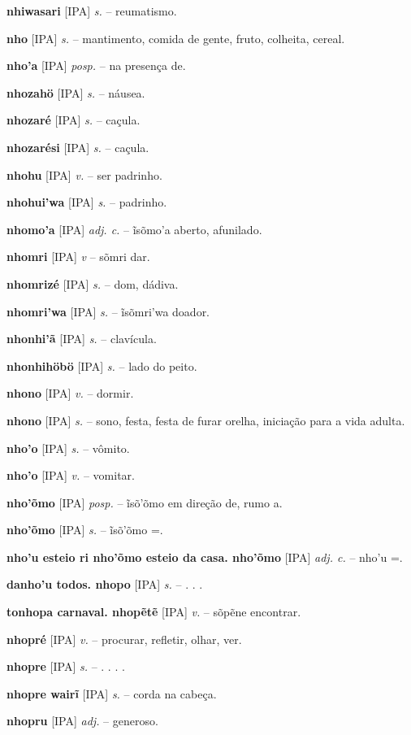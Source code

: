 \textbf{nhiwasari} [IPA] \textit{s.} -- reumatismo.

\textbf{nho} [IPA] \textit{s.} -- mantimento, comida de gente, fruto, colheita, cereal.

\textbf{nho'a} [IPA] \textit{posp.} -- na presença de.

\textbf{nhozahö} [IPA] \textit{s.} -- náusea.

\textbf{nhozaré} [IPA] \textit{s.} -- caçula.

\textbf{nhozarési} [IPA] \textit{s.} -- caçula.

\textbf{nhohu} [IPA] \textit{v.} -- ser padrinho.

\textbf{nhohui'wa} [IPA] \textit{s.} -- padrinho.

\textbf{nhomo'a} [IPA] \textit{adj. c.} -- ĩsõmo'a aberto, afunilado.

\textbf{nhomri} [IPA] \textit{v} -- sõmri dar.

\textbf{nhomrizé} [IPA] \textit{s.} -- dom, dádiva.

\textbf{nhomri'wa} [IPA] \textit{s.} -- ĩsõmri'wa doador.

\textbf{nhonhi'ã} [IPA] \textit{s.} -- clavícula.

\textbf{nhonhihöbö} [IPA] \textit{s.} -- lado do peito.

\textbf{nhono} [IPA] \textit{v.} -- dormir.

\textbf{nhono} [IPA] \textit{s.} -- sono, festa, festa de furar orelha, iniciação para a vida adulta.

\textbf{nho'o} [IPA] \textit{s.} -- vômito.

\textbf{nho'o} [IPA] \textit{v.} -- vomitar.

\textbf{nho'õmo} [IPA] \textit{posp.} -- ĩsõ'õmo em direção de, rumo a.

\textbf{nho'õmo} [IPA] \textit{s.} -- ĩsõ'õmo =.

\textbf{nho'u esteio  ri nho'õmo esteio da casa. nho'õmo} [IPA] \textit{adj. c.} -- nho'u =.

\textbf{danho'u todos. nhopo} [IPA] \textit{s.} -- . . .

\textbf{tonhopa carnaval. nhopẽtẽ} [IPA] \textit{v.} -- sõpẽne encontrar.

\textbf{nhopré} [IPA] \textit{v.} -- procurar, refletir, olhar, ver.

\textbf{nhopre} [IPA] \textit{s.} -- . . . .

\textbf{nhopre wairĩ} [IPA] \textit{s.} -- corda na cabeça.

\textbf{nhopru} [IPA] \textit{adj.} -- generoso.

